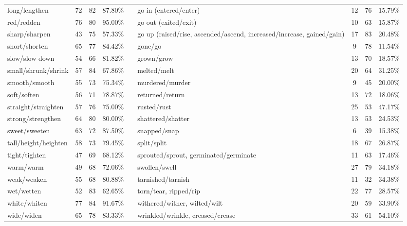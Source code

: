 \begin{tabular}{p{3cm}ccccp{3cm}ccc}
long/lengthen & 72 & 82 & 87.80\% & & go in (entered/enter) & 12 & 76 & 15.79\% \\
red/redden & 76 & 80 & 95.00\% & & go out (exited/exit) & 10 & 63 & 15.87\% \\
sharp/sharpen & 43 & 75 & 57.33\% & & go up (raised/rise, ascended/ascend, increased/increase, gained/gain) & 17 & 83 & 20.48\% \\
short/shorten & 65 & 77 & 84.42\% & & gone/go & 9 & 78 & 11.54\% \\
slow/slow down & 54 & 66 & 81.82\% & & grown/grow & 13 & 70 & 18.57\% \\
small/shrunk/shrink & 57 & 84 & 67.86\% & & melted/melt & 20 & 64 & 31.25\% \\
smooth/smooth & 55 & 73 & 75.34\% & & murdered/murder & 9 & 45 & 20.00\% \\
soft/soften & 56 & 71 & 78.87\% & & returned/return & 13 & 72 & 18.06\% \\
straight/straighten & 57 & 76 & 75.00\% & & rusted/rust & 25 & 53 & 47.17\% \\
strong/strengthen & 64 & 80 & 80.00\% & & shattered/shatter & 13 & 53 & 24.53\% \\
sweet/sweeten & 63 & 72 & 87.50\% & & snapped/snap & 6 & 39 & 15.38\% \\
tall/height/heighten & 58 & 73 & 79.45\% & & split/split & 18 & 67 & 26.87\% \\
tight/tighten & 47 & 69 & 68.12\% & & sprouted/sprout, germinated/germinate & 11 & 63 & 17.46\% \\
warm/warm & 49 & 68 & 72.06\% & & swollen/swell & 27 & 79 & 34.18\% \\
weak/weaken & 55 & 68 & 80.88\% & & tarnished/tarnish & 11 & 32 & 34.38\% \\
wet/wetten & 52 & 83 & 62.65\% & & torn/tear, ripped/rip & 22 & 77 & 28.57\% \\
white/whiten & 77 & 84 & 91.67\% & & withered/wither, wilted/wilt & 20 & 59 & 33.90\% \\
wide/widen & 65 & 78 & 83.33\% & & wrinkled/wrinkle, creased/crease & 33 & 61 & 54.10\%
\end{tabular}
